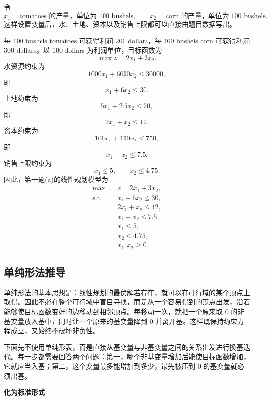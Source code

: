 ﻿\documentclass[UTF8,zihao=-4,fontset=none]{ctexart}
\newcommand{\stepheading}[1]{\vspace{0.6em}\noindent\textbf{#1}\par}
\begin{document}
令
\[
    x_1=\text{tomatoes 的产量，单位为 }100\text{ bushels},
    \qquad
    x_2=\text{corn 的产量，单位为 }100\text{ bushels}.
\]
这样设置变量后，水、土地、资本以及销售上限都可以直接由题目数据写出。

每 \(100\) bushels tomatoes 可获得利润 \(200\) dollars，每 \(100\) bushels corn 可获得利润 \(300\) dollars。以 \(100\) dollars 为利润单位，目标函数为
\[
    \max z=2x_1+3x_2. \tag{1-1}
\]
水资源约束为
\[
    1000x_1+6000x_2\le 30000,
\]
即
\[
    x_1+6x_2\le 30. \tag{1-2}
\]
土地约束为
\[
    5x_1+2.5x_2\le 30,
\]
即
\[
    2x_1+x_2\le 12. \tag{1-3}
\]
资本约束为
\[
    100x_1+100x_2\le 750,
\]
即
\[
    x_1+x_2\le 7.5. \tag{1-4}
\]
销售上限约束为
\[
    x_1\le 5,\qquad x_2\le 4.75. \tag{1-5}
\]
因此，第一题(a)的线性规划模型为
\[
    \begin{aligned}
    \max\quad & z=2x_1+3x_2,\\
    \mathrm{s.t.}\quad
      &x_1+6x_2\le 30,\\
      &2x_1+x_2\le 12,\\
      &x_1+x_2\le 7.5,\\
      &x_1\le 5,\\
      &x_2\le 4.75,\\
      &x_1,x_2\ge 0.
    \end{aligned} \tag{1-6}
\]

\subsection{单纯形法推导}

单纯形法的基本思想是：线性规划的最优解若存在，就可以在可行域的某个顶点上取得。因此不必在整个可行域中盲目寻找，而是从一个容易得到的顶点出发，沿着能够使目标函数变好的边移动到相邻顶点。每移动一次，就把一个原来取 \(0\) 的非基变量放入基中，同时让一个原来的基变量降到 \(0\) 并离开基。这样既保持约束方程成立，又始终不破坏非负性。

下面先不使用单纯形表，而是直接从基变量与非基变量之间的关系出发进行换基迭代。每一步都需要回答两个问题：第一，哪个非基变量增加后能使目标函数增加，它就应当入基；第二，这个变量最多能增加到多少，最先被压到 \(0\) 的基变量就必须出基。

\stepheading{化为标准形式}
\end{document}
